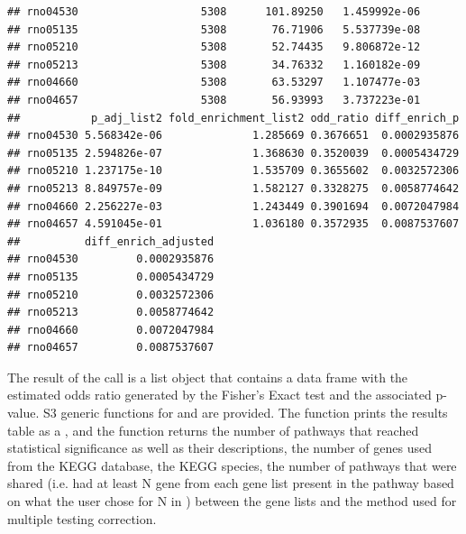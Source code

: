 \documentclass[article]{jss}\usepackage[]{graphicx}\usepackage[]{color}
\makeatletter
\newenvironment{kframe}{%
 \def\at@end@of@kframe{}%
 \ifinner\ifhmode%
  \def\at@end@of@kframe{\end{minipage}}%
  \begin{minipage}{\columnwidth}%
 \fi\fi%
 \def\FrameCommand##1{\hskip\@totalleftmargin \hskip-\fboxsep
 \colorbox{shadecolor}{##1}\hskip-\fboxsep
     \hskip-\linewidth \hskip-\@totalleftmargin \hskip\columnwidth}%
 \MakeFramed {\advance\hsize-\width
   \@totalleftmargin\z@ \linewidth\hsize
   \@setminipage}}%
 {\par\unskip\endMakeFramed%
 \at@end@of@kframe}
\newenvironment{knitrout}{}{} %
\makeatother
\begin{document}
\begin{knitrout}
\begin{kframe}
\begin{lstlisting}[basicstyle=\ttfamily,breaklines=true]
## rno04530                   5308      101.89250   1.459992e-06
## rno05135                   5308       76.71906   5.537739e-08
## rno05210                   5308       52.74435   9.806872e-12
## rno05213                   5308       34.76332   1.160182e-09
## rno04660                   5308       63.53297   1.107477e-03
## rno04657                   5308       56.93993   3.737223e-01
##           p_adj_list2 fold_enrichment_list2 odd_ratio diff_enrich_p
## rno04530 5.568342e-06              1.285669 0.3676651  0.0002935876
## rno05135 2.594826e-07              1.368630 0.3520039  0.0005434729
## rno05210 1.237175e-10              1.535709 0.3655602  0.0032572306
## rno05213 8.849757e-09              1.582127 0.3328275  0.0058774642
## rno04660 2.256227e-03              1.243449 0.3901694  0.0072047984
## rno04657 4.591045e-01              1.036180 0.3572935  0.0087537607
##          diff_enrich_adjusted
## rno04530         0.0002935876
## rno05135         0.0005434729
## rno05210         0.0032572306
## rno05213         0.0058774642
## rno04660         0.0072047984
## rno04657         0.0087537607
\end{lstlisting}
\end{kframe}
\end{knitrout}

The result of the  call is a list object that
contains a data frame with the estimated odds ratio generated
by the Fisher's Exact test and the associated p-value. S3 generic
functions for  and  are provided. The
 function prints the results table as a ,
and the  function returns the number of pathways
that reached statistical significance as well as their descriptions,
the number of genes used from the KEGG database, the KEGG species,
the number of pathways that were shared (i.e. had at least N gene
from each gene list present in the pathway based on what the user
chose for N in ) between the gene lists and the
method used for multiple testing correction.
\end{document}
